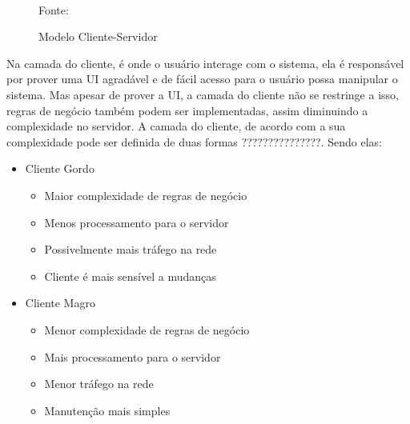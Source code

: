 \begin{figure}[h!]
\centering
\caption{Modelo Cliente-Servidor}
\\
Fonte: \cite{devmediaMultiCamadaP12018}
\label{f_c2_cliente_servidor}
\end{figure}

Na camada do cliente, é onde o usuário interage com o sistema, ela é responsável por prover uma \ac{UI} agradável e de fácil acesso para o usuário possa manipular o sistema. Mas apesar de prover a \ac{UI}, a camada do cliente não se restringe a isso, regras de negócio também podem ser implementadas, assim diminuindo a complexidade no servidor. A camada do cliente, de acordo com a sua  complexidade pode ser definida de duas formas ???????????????. Sendo elas:

\begin{itemize}
    \item Cliente Gordo
    \begin{itemize}
        \item Maior complexidade de regras de negócio
        \item Menos processamento para o servidor
        \item Possivelmente mais tráfego na rede
        \item Cliente é mais sensível a mudanças
    \end{itemize}
    \item Cliente Magro
    \begin{itemize}
        \item Menor complexidade de regras de negócio
        \item Mais processamento para o servidor
        \item Menor tráfego na rede
        \item Manutenção mais simples
    \end{itemize}
\end{itemize}

